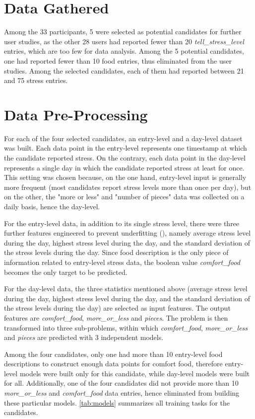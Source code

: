\section{Data Gathered}
Among the 33 participants, 5 were selected as potential candidates for further user studies, as the other 28 users had reported fewer than 20 \emph{tell\_stress\_level} entries, which are too few for data analysis. Among the 5 potential candidates, one had reported fewer than 10 food entries, thus eliminated from the user studies. Among the selected candidates, each of them had reported between 21 and 75 stress entries.

\section{Data Pre-Processing}
For each of the four selected candidates, an entry-level and a day-level dataset was built. Each data point in the entry-level represents one timestamp at which the candidate reported stress. On the contrary, each data point in the day-level represents a single day in which the candidate reported stress at least for once. This setting was chosen because, on the one hand, entry-level input is generally more frequent (most candidates report stress levels more than once per day), but on the other, the "more or less" and "number of pieces" data was collected on a daily basis, hence the day-level.

For the entry-level data, in addition to its single stress level, there were three further features engineered to prevent underfitting (\cite{42_underfitting}), namely average stress level during the day, highest stress level during the day, and the standard deviation of the stress levels during the day. Since food description is the only piece of information related to entry-level stress data, the boolean value \emph{comfort\_food} becomes the only target to be predicted.

For the day-level data, the three statistics mentioned above (average stress level during the day, highest stress level during the day, and the standard deviation of the stress levels during the day) are selected as input features. The output features are \emph{comfort\_food}, \emph{more\_or\_less} and \emph{pieces}. The problem is then transformed into three sub-problems, within which \emph{comfort\_food}, \emph{more\_or\_less} and \emph{pieces} are predicted with 3 independent models.

Among the four candidates, only one had more than 10 entry-level food descriptions to construct enough data points for comfort food, therefore entry-level models were built only for this candidate, while day-level models were built for all. Additionally, one of the four candidates did not provide more than 10 \emph{more\_or\_less} and \emph{comfort\_food} data entries, hence eliminated from building these particular models. \autoref{tab:models} summarizes all training tasks for the candidates.


